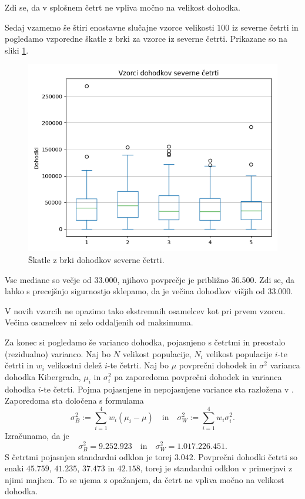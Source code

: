 \documentclass[12pt, a4paper]{article}
\begin{document}
Zdi se, da v splošnem četrt ne vpliva močno na velikost dohodka.

Sedaj vzamemo še štiri enostavne slučajne vzorce velikosti $100$ 
iz severne četrti in pogledamo vzporedne škatle z brki za vzorce
iz severne četrti. Prikazane so na sliki \ref{img:sever}.
\begin{figure}[H]
    \centering
    \includegraphics[width=12cm]{Slike/sever.png}
    \caption{Škatle z brki dohodkov severne četrti.}
    \label{img:sever}
\end{figure}
Vse mediane so večje od $33.000$, njihovo povprečje je približno 
$36.500$. Zdi se, da lahko s precejšnjo sigurnostjo sklepamo, da je večina 
dohodkov višjih od $33.000$.

V novih vzorcih ne opazimo tako ekstremnih osamelcev kot pri prvem vzorcu. Večina 
osamelcev ni zelo oddaljenih od maksimuma.

Za konec si pogledamo še varianco dohodka, pojasnjeno s četrtmi in preostalo
(rezidualno) varianco. Naj bo $N$ velikost populacije, $N_i$ velikost 
populacije $i$-te četrti in $w_i$ velikostni delež $i$-te četrti. Naj bo
$\mu$ povprečni dohodek in $\sigma^2$ varianca dohodka Kibergrada,
$\mu_i$ in $\sigma_i^2$ pa zaporedoma povprečni dohodek in varianca 
dohodka $i$-te četrti. 
Pojma pojasnjene in nepojasnjene variance sta razložena v 
\cite{raic}. Zaporedoma sta določena s formulama
\[
    \sigma^2_B := \sum_{i=1}^{4} w_i(\mu_i - \mu)
    \quad \text{in} \quad
    \sigma^2_W := \sum_{i=1}^{4} w_i\sigma_i^2.
\]
Izračunamo, da je 
\[
    \sigma^2_B = 9.252.923
    \quad \text{in} \quad
    \sigma^2_W = 1.017.226.451.
\]
S četrtmi pojasnjen standardni odklon je torej $3.042$. 
Povprečni dohodki četrti so enaki $45.759$, $41.235$, $37.473$ 
in $42.158$, torej je standardni odklon v primerjavi z njimi majhen. 
To se ujema z opažanjem, da četrt ne vpliva močno na velikost dohodka.
\newpage
\end{document}
